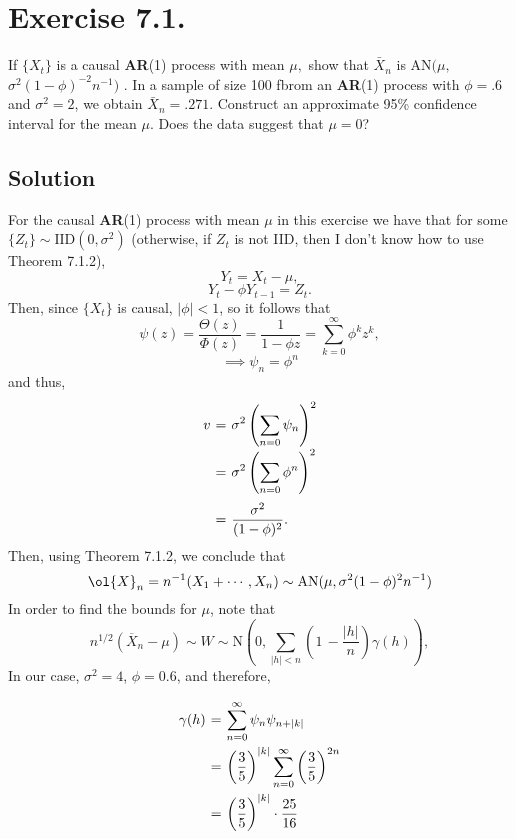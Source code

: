\section*{Exercise 7.1.}


If $\{X_{t} \}$ is a causal \textbf{AR}(1) process with mean $\mu,$ show that ${\bar{X}}_{n}$ is $\mathrm{A N} ( \mu,$  $\sigma^{2} ( 1-\phi)^{-2} n^{-1} )$ . In a sample of size 100 fbrom an \textbf{AR}(1) process with $\phi=. 6$ and $\sigma^{2}=2$, we obtain $\bar{X}_{n}=. 2 7 1$. Construct an approximate 95\% confidence interval for the mean $\mu$. Does the data suggest that $\mu=0$?

\subsection*{Solution}

For the causal \textbf{AR}(1) process with mean $\mu$ in this exercise we have that for some $\{Z_t\} \sim \mbox{IID}(0,\sigma^2)$ (otherwise, if $Z_t$ is not IID, then I don't know how to use Theorem 7.1.2),
\[ Y_t = X_t - \mu, \]
\[ Y_t - \phi Y_{t-1} = Z_t. \]
Then, since $\{X_t\}$ is causal, $|\phi| < 1$, so it follows that
\[ \psi(z) = \frac{\Theta(z)}{\Phi(z)} = \frac{1}{1-\phi z} = \sum_{k = 0}^{\infty} \phi^k z^k, \]
\[ \implies \psi_n = \phi^n \]
and thus,
\[ \everymath{\displaystyle}
\arraycolsep=1.8pt\def\arraystretch{2.5}
\begin{array}{rcl}
    v & = & \sigma^2 \left( \sum_{n = 0} \psi_n \right)^2\\
    & = & \sigma^2 \left( \sum_{n = 0} \phi^n \right)^2\\
    & = & \frac{\sigma^2}{(1-\phi)^2}.
\end{array}  \]
Then, using Theorem 7.1.2, we conclude that
\[ \ol{X}_n = n^{-1}(X_1+\cdots,X_n) \sim \mbox{AN}(\mu, \sigma^2(1-\phi)^2 n^{-1}) \]
In order to find the bounds for $\mu$, note that
\[ n^{1/2}(\overline{{{X}}}_{n}-\mu)\sim W \sim \mathrm{N}\left(0,\sum_{|h|<n}\left(1\,-\frac{|h|}{n}\right)\gamma(h)\right),
\]
In our case, $\sigma^2 = 4$, $\phi = 0.6$, and therefore,
\[ \everymath{\displaystyle}
\arraycolsep=1.8pt\def\arraystretch{2.5}
\begin{array}{rcl}
    \gamma(h) & = & \sum_{n = 0}^{\infty} \psi_n \psi_{n+|k|}\\
    & = & \left( \frac{3}{5} \right)^{|k|}  \sum_{n = 0}^{\infty} \left( \frac{3}{5} \right)^{2n}\\
    & = & \left( \frac{3}{5} \right)^{|k|}\cdot \frac{25}{16}
\end{array}  \]

